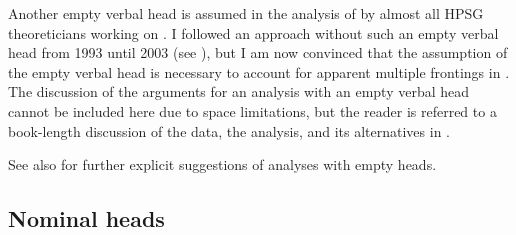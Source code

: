 \documentclass[output=paper
  ,nobabel
  ,draftmode
  ,uniformtopskip %
  ,colorlinks, citecolor=brown
]{langscibook}
\begin{document}
Another empty verbal head is assumed in the analysis of  by almost all HPSG theoreticians
working on . I followed an approach without such an empty verbal head from 1993 until 2003
(see \citealp[Section~1.9]{Mueller2002b}), but I am now convinced that the assumption of the empty
verbal head is necessary to account for apparent multiple frontings in 
\citep{Mueller2003b,Mueller2005d}. The discussion of the arguments for an analysis with an empty
verbal head cannot be included here due to space limitations, but the reader is referred to a
book-length discussion of the data, the analysis, and its alternatives in .

See also  for further explicit suggestions of analyses
with empty heads.

\subsection{Nominal heads}
\label{sec-empty-nominal-heads}
\end{document}
